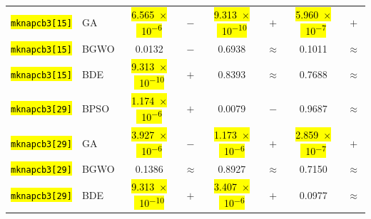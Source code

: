 \documentclass[mathematics,article,accept,moreauthors]{Definitions/mdpi}
\begin{document}
\begin{table}[H]
\begin{tabularx}{\textwidth}{Xlcccccc}
    \texttt{\hl{mknapcb3[15]}} & GA    & \hl{6.565~$\times$~10\textsuperscript{$-$6}} & $-$ & \hl{9.313~$\times$~10\textsuperscript{$-$10}} & $+$ & \hl{5.960~$\times$~10\textsuperscript{$-$7}} & $+$ \\
    \texttt{\hl{mknapcb3[15]}} & BGWO  &    0.0132 & $-$ &    0.6938 & $\approx$ &    0.1011 & $\approx$ \\
    \texttt{\hl{mknapcb3[15]}} & BDE   & \hl{9.313~$\times$~10\textsuperscript{$-$10}} & $+$ &    0.8393 & $\approx$ &    0.7688 & $\approx$ \\
    \midrule
    \texttt{\hl{mknapcb3[29]}} & BPSO  & \hl{1.174~$\times$~10\textsuperscript{$-$6}} & $+$ &    0.0079 & $-$ &    0.9687 & $\approx$ \\
    \texttt{\hl{mknapcb3[29]}} & GA    & \hl{3.927~$\times$~10\textsuperscript{$-$6}} & $-$ & \hl{1.173~$\times$~10\textsuperscript{$-$6}} & $+$ & \hl{2.859~$\times$~10\textsuperscript{$-$7}} & $+$ \\
    \texttt{\hl{mknapcb3[29]}} & BGWO  &    0.1386 & $\approx$ &    0.8927 & $\approx$ &    0.7150 & $\approx$ \\
    \texttt{\hl{mknapcb3[29]}} & BDE   & \hl{9.313~$\times$~10\textsuperscript{$-$10}} & $+$ & \hl{3.407~$\times$~10\textsuperscript{$-$6}} & $+$ &    0.0977 & $\approx$ \\




\bottomrule
\end{tabularx} %
\end{table}
\end{document}
